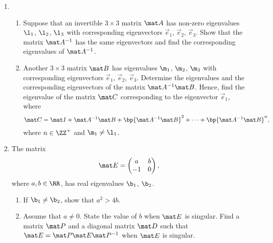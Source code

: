\begin{problem}
    \begin{enumerate}
        \item \begin{enumerate}
            \item Suppose that an invertible $3 \times 3$ matrix $\mat A$ has non-zero eigenvalues $\l_1$, $\l_2$, $\l_3$ with corresponding eigenvectors $\vec e_1$, $\vec e_2$, $\vec e_3$. Show that the matrix $\mat A^{-1}$ has the same eigenvectors and find the corresponding eigenvalues of $\mat A^{-1}$.
            \item Another $3 \times 3$ matrix $\mat B$ has eigenvalues $\m_1$, $\m_2$, $\m_3$ with corresponding eigenvectors $\vec e_1$, $\vec e_2$, $\vec e_3$. Determine the eigenvalues and the corresponding eigenvectors of the matrix $\mat A^{-1} \mat B$. Hence, find the eigenvalue of the matrix $\mat C$ corresponding to the eigenvector $\vec e_1$, where \[\mat C = \mat I + \mat A^{-1} \mat B + \bp{\mat A^{-1} \mat B}^2 + \dots + \bp{\mat A^{-1} \mat B}^n,\] where $n \in \ZZ^+$ and $\m_1 \neq \l_1$.
        \end{enumerate}
        \item The matrix \[\mat E = \begin{pmatrix}a & b \\ -1 & 0\end{pmatrix},\] where $a, b \in \RR$, has real eigenvalues $\b_1$, $\b_2$.
        \begin{enumerate}
            \item If $\b_1 \neq \b_2$, show that $a^2 > 4b$.
            \item Assume that $a \neq 0$. State the value of $b$ when $\mat E$ is singular. Find a matrix $\mat P$ and a diagonal matrix $\mat D$ such that $\mat E = \mat P \mat E \mat P^{-1}$ when $\mat E$ is singular.
        \end{enumerate}
    \end{enumerate}
\end{problem}
